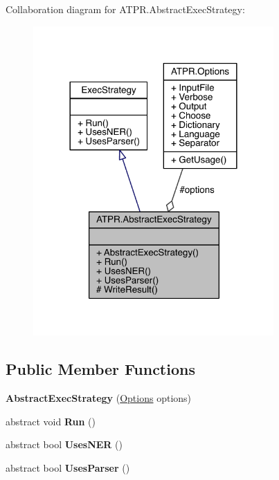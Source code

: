 Collaboration diagram for A\+T\+P\+R.\+Abstract\+Exec\+Strategy\+:
\nopagebreak
\begin{figure}[H]
\begin{center}
\leavevmode
\includegraphics[width=260pt]{d1/dcb/class_a_t_p_r_1_1_abstract_exec_strategy__coll__graph}
\end{center}
\end{figure}
\subsection*{Public Member Functions}
\begin{DoxyCompactItemize}
\item 
\hypertarget{class_a_t_p_r_1_1_abstract_exec_strategy_a0fb3ff91dd3668e7bc5acea78d83598c}{}\label{class_a_t_p_r_1_1_abstract_exec_strategy_a0fb3ff91dd3668e7bc5acea78d83598c} 
{\bfseries Abstract\+Exec\+Strategy} (\hyperlink{class_a_t_p_r_1_1_options}{Options} options)
\item 
\hypertarget{class_a_t_p_r_1_1_abstract_exec_strategy_ac8fe75fd5a06c7fb01f64658dd3b35ae}{}\label{class_a_t_p_r_1_1_abstract_exec_strategy_ac8fe75fd5a06c7fb01f64658dd3b35ae} 
abstract void {\bfseries Run} ()
\item 
\hypertarget{class_a_t_p_r_1_1_abstract_exec_strategy_ab17073dc4fa6f287b5258d3f55fc1627}{}\label{class_a_t_p_r_1_1_abstract_exec_strategy_ab17073dc4fa6f287b5258d3f55fc1627} 
abstract bool {\bfseries Uses\+N\+ER} ()
\item 
\hypertarget{class_a_t_p_r_1_1_abstract_exec_strategy_a3d030a285e4dfe4256eefa335df3785b}{}\label{class_a_t_p_r_1_1_abstract_exec_strategy_a3d030a285e4dfe4256eefa335df3785b} 
abstract bool {\bfseries Uses\+Parser} ()
\end{DoxyCompactItemize}
